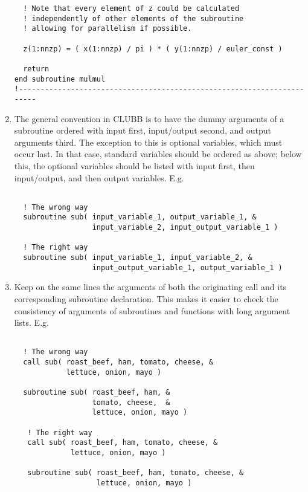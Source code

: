 \documentclass[letterpaper,12pt]{article}
\begin{document}
\begin{enumerate}
\begin{verbatim}
  ! Note that every element of z could be calculated 
  ! independently of other elements of the subroutine
  ! allowing for parallelism if possible.

  z(1:nnzp) = ( x(1:nnzp) / pi ) * ( y(1:nnzp) / euler_const )

  return
end subroutine mulmul
!-----------------------------------------------------------------------
\end{verbatim}

\item The general convention in CLUBB is to have the dummy arguments of a subroutine 
ordered with input first, input/output second, and output arguments third. 
The exception to this is optional variables, which must occur last.  In that case,
standard variables should be ordered as above; below this, the optional variables should
be listed with input first, then input/output, and then output variables.
\newline
E.g.
\begin{verbatim}

  ! The wrong way
  subroutine sub( input_variable_1, output_variable_1, &
                  input_variable_2, input_output_variable_1 )

  ! The right way
  subroutine sub( input_variable_1, input_variable_2, &
                  input_output_variable_1, output_variable_1 )

\end{verbatim}

\item Keep on the same lines the arguments of both the originating call and its 
corresponding subroutine declaration.  This makes it easier to check the 
consistency of arguments of subroutines and functions with long argument lists.
\newline 
E.g.
\begin{verbatim}

  ! The wrong way
  call sub( roast_beef, ham, tomato, cheese, &
            lettuce, onion, mayo )

  subroutine sub( roast_beef, ham, &
                  tomato, cheese,  &
                  lettuce, onion, mayo )

   ! The right way
   call sub( roast_beef, ham, tomato, cheese, &
             lettuce, onion, mayo )

   subroutine sub( roast_beef, ham, tomato, cheese, &
                   lettuce, onion, mayo )

\end{verbatim}


\end{enumerate}
\end{document}
